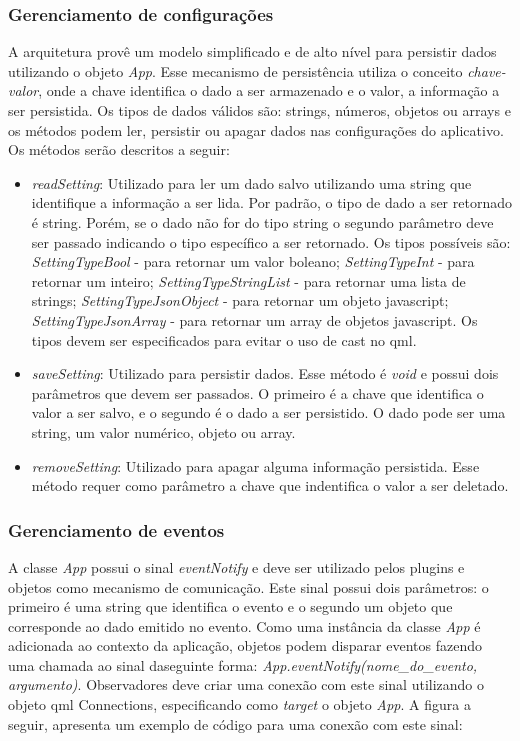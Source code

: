 \subsubsection{Gerenciamento de configurações}
A arquitetura provê um modelo simplificado e de alto nível para persistir dados utilizando o objeto \textit{App}. Esse mecanismo de persistência utiliza o conceito \textit{chave-valor}, onde a chave identifica o dado a ser armazenado e o valor, a informação a ser persistida. Os tipos de dados válidos são: strings, números, objetos ou arrays e os métodos podem ler, persistir ou apagar dados nas configurações do aplicativo. Os métodos serão descritos a seguir:
	\begin{itemize}
		\item \textit{readSetting}: Utilizado para ler um dado salvo utilizando uma string que identifique a informação a ser lida. Por padrão, o tipo de dado a ser retornado é string. Porém, se o dado não for do tipo string o segundo parâmetro deve ser passado indicando o tipo específico a ser retornado. Os tipos possíveis são: \textit{SettingTypeBool} - para retornar um valor boleano; \textit{SettingTypeInt} - para retornar um inteiro; \textit{SettingTypeStringList} - para retornar uma lista de strings; \textit{SettingTypeJsonObject} - para retornar um objeto javascript; \textit{SettingTypeJsonArray} - para retornar um array de objetos javascript. Os tipos devem ser especificados para evitar o uso de cast no qml.

		\item \textit{saveSetting}: Utilizado para persistir dados. Esse método é \textit{void} e possui dois parâmetros que devem ser passados. O primeiro é a chave que identifica o valor a ser salvo, e o segundo é o dado a ser persistido. O dado pode ser uma string, um valor numérico, objeto ou array.

		\item \textit{removeSetting}: Utilizado para apagar alguma informação persistida. Esse método requer como parâmetro a chave que indentifica o valor a ser deletado.
	\end{itemize}

\subsubsection{Gerenciamento de eventos}
A classe \textit{App} possui o sinal \textit{eventNotify} e deve ser utilizado pelos plugins e objetos como mecanismo de comunicação. Este sinal possui dois parâmetros: o primeiro é uma string que identifica o evento e o segundo um objeto que corresponde ao dado emitido no evento. Como uma instância da classe \textit{App} é adicionada ao contexto da aplicação, objetos podem disparar eventos fazendo uma chamada ao sinal daseguinte forma: \textit{App.eventNotify(nome\_do\_evento, argumento)}. Observadores deve criar uma conexão com este sinal utilizando o objeto qml Connections, especificando como \textit{target} o objeto \textit{App}. A figura a seguir, apresenta um exemplo de código para uma conexão com este sinal:

